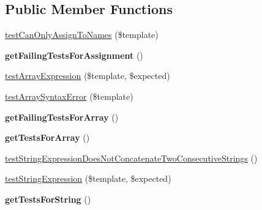 \subsection*{Public Member Functions}
\begin{DoxyCompactItemize}
\item 
\hyperlink{classTwig__Tests__ExpressionParserTest_ae8705e39d874b275b223425c6606254a}{test\+Can\+Only\+Assign\+To\+Names} (\$template)
\item 
{\bfseries get\+Failing\+Tests\+For\+Assignment} ()\hypertarget{classTwig__Tests__ExpressionParserTest_a7015b591d01069faca99ada48c43d9e6}{}\label{classTwig__Tests__ExpressionParserTest_a7015b591d01069faca99ada48c43d9e6}

\item 
\hyperlink{classTwig__Tests__ExpressionParserTest_a211095d76dc4ee025e383b29010a46dd}{test\+Array\+Expression} (\$template, \$expected)
\item 
\hyperlink{classTwig__Tests__ExpressionParserTest_afd8859cdf64b3ba6f0222edafc61e1f0}{test\+Array\+Syntax\+Error} (\$template)
\item 
{\bfseries get\+Failing\+Tests\+For\+Array} ()\hypertarget{classTwig__Tests__ExpressionParserTest_ae79b9ea092c1e4515fe1033c481671ac}{}\label{classTwig__Tests__ExpressionParserTest_ae79b9ea092c1e4515fe1033c481671ac}

\item 
{\bfseries get\+Tests\+For\+Array} ()\hypertarget{classTwig__Tests__ExpressionParserTest_a47aef6705f20e779113ca3db190d662e}{}\label{classTwig__Tests__ExpressionParserTest_a47aef6705f20e779113ca3db190d662e}

\item 
\hyperlink{classTwig__Tests__ExpressionParserTest_ac826240513c543473c3a71b132240d48}{test\+String\+Expression\+Does\+Not\+Concatenate\+Two\+Consecutive\+Strings} ()
\item 
\hyperlink{classTwig__Tests__ExpressionParserTest_a0f66b4a5fb1990fa886bf4e744da938a}{test\+String\+Expression} (\$template, \$expected)
\item 
{\bfseries get\+Tests\+For\+String} ()\hypertarget{classTwig__Tests__ExpressionParserTest_a30df00de13721267e2440a6c25578de7}{}\label{classTwig__Tests__ExpressionParserTest_a30df00de13721267e2440a6c25578de7}


\end{DoxyCompactItemize}
